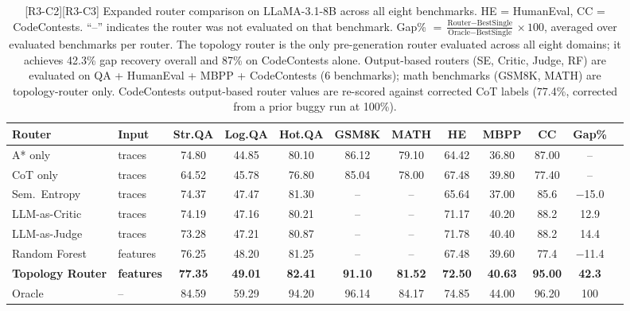 \documentclass[11pt]{article}
\begin{document}
\begin{table}[t]
\centering
\small
\setlength{\tabcolsep}{4pt}
\begin{tabular}{llcccccccccc}
\toprule
\textbf{Router} & \textbf{Input}
& \textbf{Str.QA} & \textbf{Log.QA} & \textbf{Hot.QA}
& \textbf{GSM8K} & \textbf{MATH}
& \textbf{HE} & \textbf{MBPP} & \textbf{CC}
& \textbf{Gap\%} \\
\midrule
A* only & traces & 74.80 & 44.85 & 80.10 & 86.12 & 79.10 & 64.42 & 36.80 & 87.00 & -- \\
CoT only & traces & 64.52 & 45.78 & 76.80 & 85.04 & 78.00 & 67.48 & 39.80 & 77.40 & -- \\
\midrule
Sem.\ Entropy & traces & 74.37 & 47.47 & 81.30 & -- & -- & 65.64 & 37.00 & 85.6 & $-$15.0 \\
LLM-as-Critic & traces & 74.19 & 47.16 & 80.21 & -- & -- & 71.17 & 40.20 & 88.2 & 12.9 \\
LLM-as-Judge & traces & 73.28 & 47.21 & 80.87 & -- & -- & 71.78 & 40.40 & 88.2 & 14.4 \\
Random Forest & features & 76.25 & 48.20 & 81.25 & -- & -- & 67.48 & 39.60 & 77.4 & $-$11.4 \\
\textbf{Topology Router} & \textbf{features} & \textbf{77.35} & \textbf{49.01} & \textbf{82.41} & \textbf{91.10} & \textbf{81.52} & \textbf{72.50} & \textbf{40.63} & \textbf{95.00} & \textbf{42.3} \\
\midrule
Oracle & -- & 84.59 & 59.29 & 94.20 & 96.14 & 84.17 & 74.85 & 44.00 & 96.20 & 100 \\
\bottomrule
\end{tabular}
\caption{\textcolor{reviewerpurple}{[R3-C2][R3-C3] Expanded router comparison on LLaMA-3.1-8B across all eight benchmarks. HE = HumanEval, CC = CodeContests. ``--'' indicates the router was not evaluated on that benchmark. Gap\% $= \frac{\text{Router} - \text{BestSingle}}{\text{Oracle} - \text{BestSingle}} \times 100$, averaged over evaluated benchmarks per router. The topology router is the only pre-generation router evaluated across all eight domains; it achieves 42.3\% gap recovery overall and 87\% on CodeContests alone. Output-based routers (SE, Critic, Judge, RF) are evaluated on QA + HumanEval + MBPP + CodeContests (6 benchmarks); math benchmarks (GSM8K, MATH) are topology-router only. CodeContests output-based router values are re-scored against corrected CoT labels (77.4\%, corrected from a prior buggy run at 100\%).}}
\label{tab:router_expanded}
\end{table}
\end{document}
